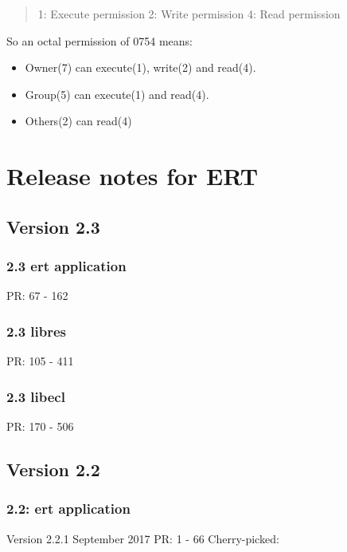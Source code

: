 \documentclass[a4paper,10pt,english]{sphinxmanual}
\begin{document}
\begin{sphinxShadowBox}
\begin{quote}
1: Execute permission
2: Write permission
4: Read permission
\end{quote}

So an octal permission of 0754 means:
\begin{itemize}
\item {} 
Owner(7) can execute(1), write(2) and read(4).

\item {} 
Group(5) can execute(1) and read(4).

\item {} 
Others(2) can read(4)

\end{itemize}
\end{sphinxShadowBox}


\chapter{Release notes for ERT}
\label{\detokenize{changes/index:release-notes-for-ert}}\label{\detokenize{changes/index::doc}}

\section{Version 2.3}
\label{\detokenize{changes/index:version-2-3}}

\subsection{2.3 ert application}
\label{\detokenize{changes/index:ert-application}}
PR: 67 - 162


\subsection{2.3 libres}
\label{\detokenize{changes/index:libres}}
PR: 105 - 411


\subsection{2.3 libecl}
\label{\detokenize{changes/index:libecl}}
PR: 170 - 506


\section{Version 2.2}
\label{\detokenize{changes/index:version-2-2}}

\subsection{2.2: ert application}
\label{\detokenize{changes/index:id1}}
Version 2.2.1 September 2017 PR: 1 - 66
Cherry-picked: 
\end{document}

